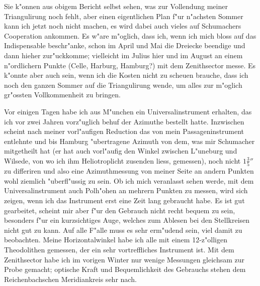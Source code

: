 \documentclass[12pt,a4paper]{article}
\theoremstyle{plain}
\theoremstyle{definition}
\theoremstyle{remark}
\begin{document}
Sie k"onnen aus obigem Bericht selbst sehen, was zur Vollendung meiner Triangulirung noch fehlt, aber einen eigentlichen Plan f"ur n"achsten Sommer kann ich jetzt noch nicht machen, es wird dabei auch vieles auf Schumachers Cooperation ankommen. Es w"are m"oglich, dass ich, wenn ich mich bloss auf das Indispensable beschr"anke, schon im April und Mai die Dreiecke beendige und dann hieher zur"uckkomme; vielleicht im Julius hier und im August an einem n"ordlichern Punkte (Celle, Harburg, Hamburg?) mit dem Zenithsector messe. Es k"onnte aber auch sein, wenn ich die Kosten nicht zu scheuen brauche, dass ich noch den ganzen Sommer auf die Triangulirung wende, um alles zur m"oglich gr"ossten Vollkommenheit zu bringen.

Vor einigen Tagen habe ich aus M"unchen ein Universalinstrument erhalten, das ich vor zwei Jahren vorz"uglich behuf der Azimuthe bestellt hatte. Inzwischen scheint nach meiner vorl"aufigen Reduction das von mein Passageninstrument entlehnte und bis Hamburg "ubertragene Azimuth von dem, was mir Schumacher mitgetheilt hat (er hat auch vorl"aufig den Winkel zwischen L"uneburg und Wilsede, von wo ich ihm Heliotroplicht zusenden liess, gemessen), noch nicht $1\frac{3}{5}''$ zu differiren und also eine Azimuthmessung von meiner Seite an andern Punkten wohl ziemlich "uberfl"ussig zu sein. Ob ich mich veranlasst sehen werde, mit dem Universalinstrument auch Polh"ohen an mehrern Punkten zu messen, wird sich zeigen, wenn ich das Instrument erst eine Zeit lang gebraucht habe. Es ist gut gearbeitet, scheint mir aber f"ur den Gebrauch nicht recht bequem zu sein, besonders f"ur ein kurzsichtiges Auge, welches zum Ablesen bei den Stellkreisen nicht gut zu kann. Auf alle F"alle muss es sehr erm"udend sein, viel damit zu beobachten. Meine Horizontalwinkel habe ich alle mit einem 12-z"olligen Theodolithen gemessen, der ein sehr vortreffliches Instrument ist. Mit dem Zenithsector habe ich im vorigen Winter nur wenige Messungen gleichsam zur Probe gemacht; optische Kraft und Bequemlichkeit des Gebrauchs stehen dem Reichenbachschen Meridiankreis sehr nach.
\end{document}

